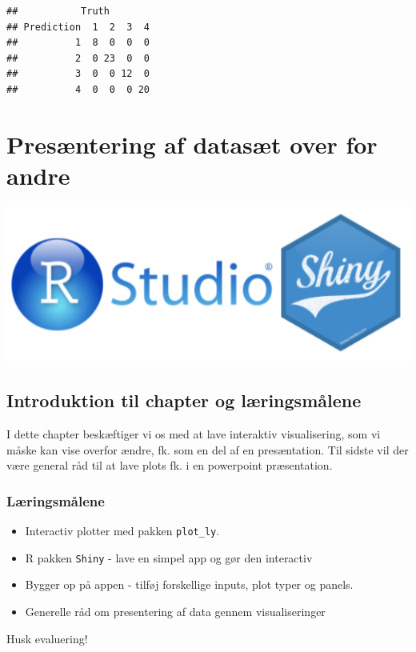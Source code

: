 \documentclass[
]{book}
\providecommand{\tightlist}{%
  \setlength{\itemsep}{0pt}\setlength{\parskip}{0pt}}
\begin{document}
\begin{verbatim}
##           Truth
## Prediction  1  2  3  4
##          1  8  0  0  0
##          2  0 23  0  0
##          3  0  0 12  0
##          4  0  0  0 20
\end{verbatim}

\hypertarget{presuxe6ntering-af-datasuxe6t-over-for-andre}{%
\chapter{Presæntering af datasæt over for andre}\label{presuxe6ntering-af-datasuxe6t-over-for-andre}}

\includegraphics[width=0.35\linewidth]{plots/shiny_logo}

\hypertarget{introduktion-til-chapter-og-luxe6ringsmuxe5lene}{%
\section{Introduktion til chapter og læringsmålene}\label{introduktion-til-chapter-og-luxe6ringsmuxe5lene}}

I dette chapter beskæftiger vi os med at lave interaktiv visualisering, som vi måske kan vise overfor ændre, fk. som en del af en presæntation. Til sidste vil der være general råd til at lave plots fk. i en powerpoint præsentation.

\hypertarget{luxe6ringsmuxe5lene-8}{%
\subsection{Læringsmålene}\label{luxe6ringsmuxe5lene-8}}

\begin{itemize}
\tightlist
\item
  Interactiv plotter med pakken \texttt{plot\_ly}.
\item
  R pakken \texttt{Shiny} - lave en simpel app og gør den interactiv
\item
  Bygger op på appen - tilføj forskellige inputs, plot typer og panels.
\item
  Generelle råd om presentering af data gennem visualiseringer
\end{itemize}

Husk evaluering!
\end{document}
